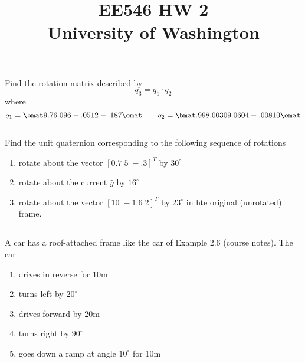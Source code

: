 \documentclass{article}
\begin{document}
\title{EE546 HW 2 \\ University of Washington}
\setcounter{section}{2}


\maketitle

\subsection{}          %
Find the rotation matrix described by
\[
q_3 = q_1\cdot q_2
\]
where
\[
q_1 = \bmat 9.76\\.096\\-.0512\\-.187\emat \qquad q_2 = \bmat .998\\.00309\\.0604\\-.00810 \emat
\]

\subsection{}

Find the unit quaternion corresponding to the following sequence of rotations
\begin{enumerate}
  \item rotate about the vector $[0.7\; 5\; -.3 ]^T$ by $30^\circ$
  \item rotate about the current $\hat{y}$  by $16^\circ$
  \item rotate about the vector $[10\;-1.6\;2 ]^T$ by $23^\circ$ in hte original (unrotated) frame.
\end{enumerate}

\subsection{}

A car has a roof-attached frame like the car of Example 2.6 (course notes).   The car
\begin{enumerate}
    \item drives in reverse for 10m
    \item turns left by $20^\circ$
    \item drives forward by 20m
    \item turns right by $90^\circ$
    \item goes down a ramp at angle $10^\circ$ for 10m
\end{enumerate}
\end{document}
